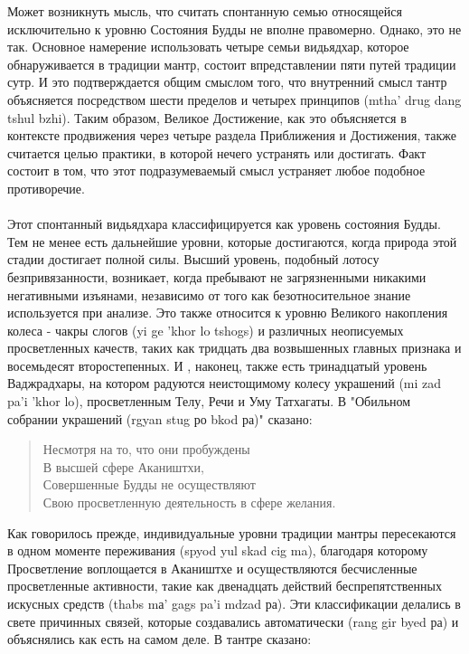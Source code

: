 Может возникнуть мысль, что считать спонтанную семью относящейся
исключительно к уровню Состояния Будды не вполне правомерно. Однако, это не так.
Основное намерение использовать четыре семьи видьядхар, которое обнаруживается в
традиции мантр, состоит впредставлении пяти путей традиции сутр. И это подтверждается
общим смыслом того, что внутренний смысл тантр объясняется посредством шести пределов
и четырех принципов (mtha' drug dang tshul bzhi). Таким образом, Великое Достижение, как
это объясняется в контексте продвижения через четыре раздела Приближения и Достижения,
также считается целью практики, в которой нечего устранять или достигать. Факт состоит в
том, что этот подразумеваемый смысл устраняет любое подобное противоречие.\\
\\
Этот спонтанный видьядхара классифицируется как уровень состояния Будды. Тем не
менее есть дальнейшие уровни, которые достигаются, когда природа этой стадии достигает
полной силы. Высший уровень, подобный лотосу безпривязанности, возникает, когда
пребывают не загрязненными никакими негативными изъянами, независимо от того как
безотносительное знание используется при анализе. Это также относится к уровню Великого
накопления колеса - чакры слогов (yi ge 'khor lo tshogs) и различных неописуемых
просветленных качеств, таких как тридцать два возвышенных главных признака и
восемьдесят второстепенных. И , наконец, также есть тринадцатый уровень Ваджрадхары, на
котором радуются неистощимому колесу украшений (mi zad pa'i 'khor lo), просветленным
Телу, Речи и Уму Татхагаты. В "Обильном собрании украшений (rgyan stug ро bkod ра)"
сказано:

\begin{verse}
Несмотря на то, что они пробуждены\\
В высшей сфере Акаништхи,\\
Совершенные Будды не осуществляют\\
Свою просветленную деятельность в сфере желания.
\end{verse}

Как говорилось прежде, индивидуальные уровни традиции мантры пересекаются в
одном моменте переживания (spyod yul skad cig ma), благодаря которому Просветление
воплощается в Акаништхе и осуществляются бесчисленные просветленные активности,
такие как двенадцать действий беспрепятственных искусных средств (thabs mа' gags pa'i
mdzad ра). Эти классификации делались в свете причинных связей, которые создавались
автоматически (rang gir byed ра) и объяснялись как есть на самом деле. В тантре сказано:

